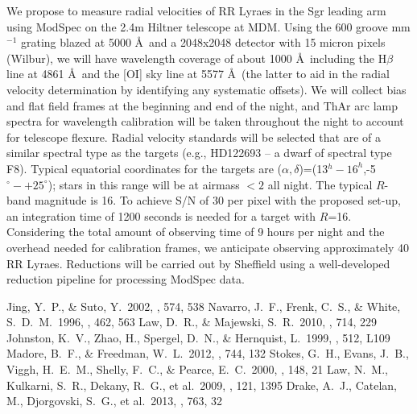 \documentclass[preprint]{aastex}
\begin{document}
We propose to measure radial velocities of RR Lyraes in the Sgr
leading arm using ModSpec on the 2.4m Hiltner telescope at MDM.  Using
the 600 groove mm$^{-1}$ grating blazed at 5000 \AA\ and a 2048x2048
detector with 15 micron pixels (Wilbur), we will have wavelength
coverage of about 1000 \AA\, including the H$\beta$ line at 4861
\AA\ and the [OI] sky line at 5577 \AA\ (the latter to aid in the
radial velocity determination by identifying any systematic offsets).
We will collect bias and flat field frames at the beginning and end of
the night, and ThAr arc lamp spectra for wavelength calibration will
be taken throughout the night to account for telescope flexure.
Radial velocity standards will be selected that are of a similar
spectral type as the targets (e.g., HD122693 -- a dwarf of spectral
type F8).  Typical equatorial coordinates for the targets are
($\alpha,\delta$)=(13$^{h}-16^{h}$,-5$^{\circ}- +25^{\circ}$); stars
in this range will be at airmass $<2$ all night.  The typical $R$-band
magnitude is 16.  To achieve S/N of 30 per pixel with the proposed
set-up, an integration time of 1200 seconds is needed for a target
with $R$=16.  Considering the total amount of observing time of 9
hours per night and the overhead needed for calibration frames, we
anticipate observing approximately 40 RR Lyraes.  Reductions will be
carried out by Sheffield using a well-developed reduction pipeline for
processing ModSpec data.

\begin{thebibliography}{ }
 Jing, Y.~P., \& Suto, Y.\ 2002, \apj, 574, 538
 Navarro, J.~F., Frenk, C.~S., \& White, S.~D.~M.\ 1996, \apj, 462, 563
 Law, D.~R., \& Majewski, S.~R.\ 2010, \apj, 714, 229 
 Johnston, K.~V., Zhao, H., Spergel, D.~N., \& Hernquist, L.\ 1999, \apjl, 512, L109 
 Madore, B.~F., \& Freedman, W.~L.\ 2012, \apj, 744, 132 
 Stokes, G.~H., Evans, J.~B., Viggh, H.~E.~M., Shelly, F.~C., \& Pearce, E.~C.\ 2000, \icarus, 148, 21 
 Law, N.~M., Kulkarni, S.~R., Dekany, R.~G., et al.\ 2009, \pasp, 121, 1395 
 Drake, A.~J., Catelan, M., Djorgovski, S.~G., et al.\ 2013, \apj, 763, 32 
\end{thebibliography}
\end{document}
